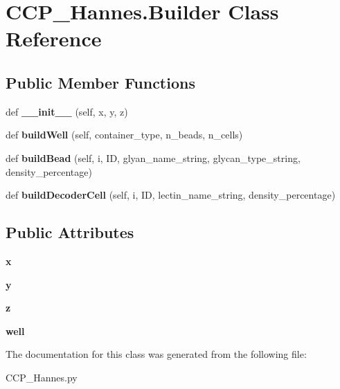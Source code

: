 \hypertarget{class_c_c_p___hannes_1_1_builder}{}\section{C\+C\+P\+\_\+\+Hannes.\+Builder Class Reference}
\label{class_c_c_p___hannes_1_1_builder}
\subsection*{Public Member Functions}
\begin{DoxyCompactItemize}
\item 
\mbox{\label{class_c_c_p___hannes_1_1_builder_a4ac93ff13f014c884aac67f4f3114087}} 
def {\bfseries \+\_\+\+\_\+init\+\_\+\+\_\+} (self, x, y, z)
\item 
\mbox{\label{class_c_c_p___hannes_1_1_builder_a0fec345dd5970ba6c4bf0ff698e967f8}} 
def {\bfseries build\+Well} (self, container\+\_\+type, n\+\_\+beads, n\+\_\+cells)
\item 
\mbox{\label{class_c_c_p___hannes_1_1_builder_aecc5d7647ff893b666d0041008b496fd}} 
def {\bfseries build\+Bead} (self, i, ID, glyan\+\_\+name\+\_\+string, glycan\+\_\+type\+\_\+string, density\+\_\+percentage)
\item 
\mbox{\label{class_c_c_p___hannes_1_1_builder_a27d07fcf53d3fa8a81b829bb4eea7cc7}} 
def {\bfseries build\+Decoder\+Cell} (self, i, ID, lectin\+\_\+name\+\_\+string, density\+\_\+percentage)
\end{DoxyCompactItemize}
\subsection*{Public Attributes}
\begin{DoxyCompactItemize}
\item 
\mbox{\label{class_c_c_p___hannes_1_1_builder_a51d328b6af6e0fb918f16dce16e32138}} 
{\bfseries x}
\item 
\mbox{\label{class_c_c_p___hannes_1_1_builder_a77b97e64bc2de9a587863263b4e2497d}} 
{\bfseries y}
\item 
\mbox{\label{class_c_c_p___hannes_1_1_builder_a3d33e45accca50760fbc8a23cb8578de}} 
{\bfseries z}
\item 
\mbox{\label{class_c_c_p___hannes_1_1_builder_ab0c32a1f39454bb20e1cedde5a3597f4}} 
{\bfseries well}
\end{DoxyCompactItemize}


The documentation for this class was generated from the following file\+:\begin{DoxyCompactItemize}
\item 
C\+C\+P\+\_\+\+Hannes.\+py\end{DoxyCompactItemize}
